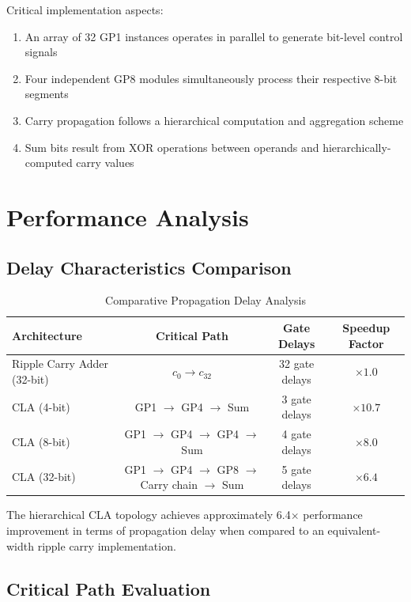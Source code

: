 \documentclass[a4paper, 11pt]{article}
\begin{document}
Critical implementation aspects:
\begin{enumerate}
    \item An array of 32 GP1 instances operates in parallel to generate bit-level control signals
    \item Four independent GP8 modules simultaneously process their respective 8-bit segments
    \item Carry propagation follows a hierarchical computation and aggregation scheme
    \item Sum bits result from XOR operations between operands and hierarchically-computed carry values
\end{enumerate}

\section{Performance Analysis}

\subsection{Delay Characteristics Comparison}

\begin{table}[H]
\centering
\begin{tabular}{|l|c|c|c|}
\hline
\textbf{Architecture} & \textbf{Critical Path} & \textbf{Gate Delays} & \textbf{Speedup Factor} \\
\hline
Ripple Carry Adder (32-bit) & $c_0 \rightarrow c_{32}$ & 32 gate delays & $\times 1.0$ \\
\hline
CLA (4-bit) & GP1 $\rightarrow$ GP4 $\rightarrow$ Sum & 3 gate delays & $\times 10.7$ \\
\hline
CLA (8-bit) & GP1 $\rightarrow$ GP4 $\rightarrow$ GP4 $\rightarrow$ Sum & 4 gate delays & $\times 8.0$ \\
\hline
CLA (32-bit) & GP1 $\rightarrow$ GP4 $\rightarrow$ GP8 $\rightarrow$ Carry chain $\rightarrow$ Sum & 5 gate delays & $\times 6.4$ \\
\hline
\end{tabular}
\caption{Comparative Propagation Delay Analysis}
\end{table}

The hierarchical CLA topology achieves approximately 6.4$\times$ performance improvement in terms of propagation delay when compared to an equivalent-width ripple carry implementation.

\subsection{Critical Path Evaluation}
\end{document}
